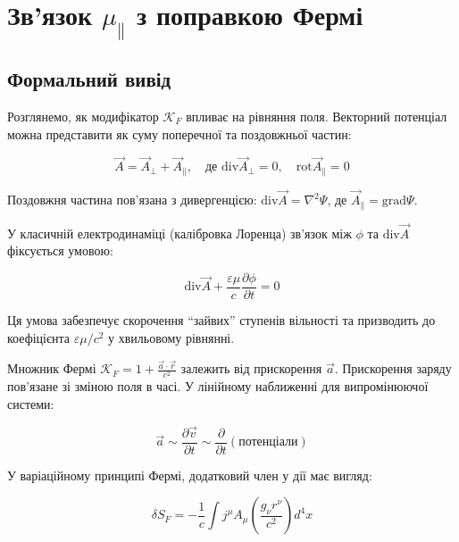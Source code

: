 \documentclass[12pt, a4paper]{article}
\begin{document}
\section{Зв'язок $\mu_{\parallel}$ з поправкою Фермі}

\subsection{Формальний вивід}

Розглянемо, як модифікатор $\mathcal{K}_F$ впливає на рівняння поля. Векторний потенціал можна представити як суму поперечної та поздовжньої частин:

\begin{equation}
\vec{A} = \vec{A}_{\perp} + \vec{A}_{\parallel}, \quad \text{де } \text{div} \vec{A}_{\perp} = 0, \quad \text{rot} \vec{A}_{\parallel} = 0
\label{eq:potential_decomposition}
\end{equation}

Поздовжня частина пов'язана з дивергенцією: $\text{div} \vec{A} = \nabla^2 \Psi$, де $\vec{A}_{\parallel} = \text{grad} \Psi$.

У класичній електродинаміці (калібровка Лоренца) зв'язок між $\phi$ та $\text{div} \vec{A}$ фіксується умовою:

\begin{equation}
\text{div} \vec{A} + \frac{\varepsilon \mu}{c} \frac{\partial \phi}{\partial t} = 0
\label{eq:lorentz_condition}
\end{equation}

Ця умова забезпечує скорочення ``зайвих'' ступенів вільності та призводить до коефіцієнта $\varepsilon \mu / c^2$ у хвильовому рівнянні.

Множник Фермі $\mathcal{K}_F = 1 + \frac{\vec{a} \cdot \vec{r}}{c^2}$ залежить від прискорення $\vec{a}$. Прискорення заряду пов'язане зі зміною поля в часі. У лінійному наближенні для випромінюючої системи:

\begin{equation}
\vec{a} \sim \frac{\partial \vec{v}}{\partial t} \sim \frac{\partial}{\partial t} (\text{потенціали})
\label{eq:acceleration_potentials}
\end{equation}

У варіаційному принципі Фермі, додатковий член у дії має вигляд:

\begin{equation}
\delta S_F = -\frac{1}{c} \int j^\mu A_\mu \left( \frac{g_\nu r^\nu}{c^2} \right) d^4x
\label{eq:fermi_action_term}
\end{equation}
\end{document}
